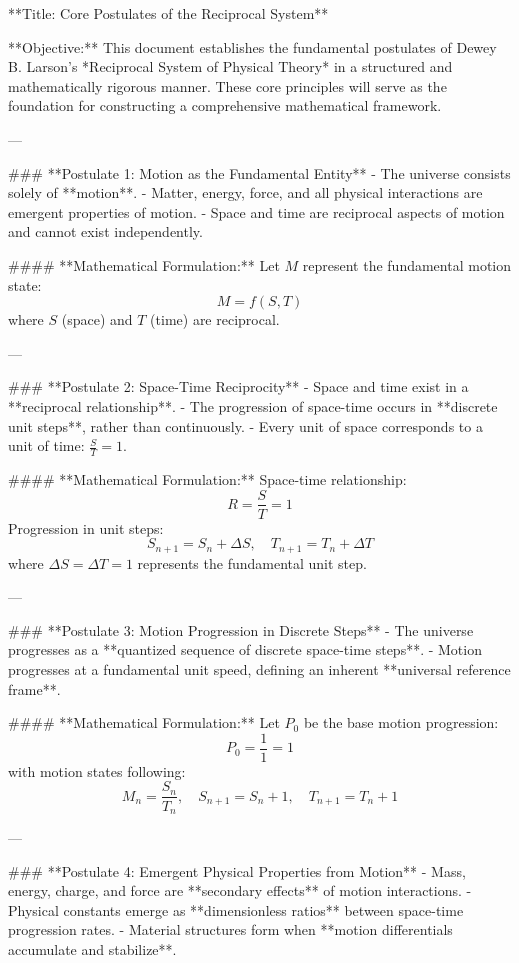 **Title: Core Postulates of the Reciprocal System**

**Objective:**
This document establishes the fundamental postulates of Dewey B. Larson’s *Reciprocal System of Physical Theory* in a structured and mathematically rigorous manner. These core principles will serve as the foundation for constructing a comprehensive mathematical framework.

---

### **Postulate 1: Motion as the Fundamental Entity**
- The universe consists solely of **motion**.
- Matter, energy, force, and all physical interactions are emergent properties of motion.
- Space and time are reciprocal aspects of motion and cannot exist independently.

#### **Mathematical Formulation:**
Let \( M \) represent the fundamental motion state:
\[
M = f(S, T)
\]
where \( S \) (space) and \( T \) (time) are reciprocal.

---

### **Postulate 2: Space-Time Reciprocity**
- Space and time exist in a **reciprocal relationship**.
- The progression of space-time occurs in **discrete unit steps**, rather than continuously.
- Every unit of space corresponds to a unit of time: \( \frac{S}{T} = 1 \).

#### **Mathematical Formulation:**
Space-time relationship:
\[
 R = \frac{S}{T} = 1
\]
Progression in unit steps:
\[
 S_{n+1} = S_n + \Delta S, \quad T_{n+1} = T_n + \Delta T
\]
where \( \Delta S = \Delta T = 1 \) represents the fundamental unit step.

---

### **Postulate 3: Motion Progression in Discrete Steps**
- The universe progresses as a **quantized sequence of discrete space-time steps**.
- Motion progresses at a fundamental unit speed, defining an inherent **universal reference frame**.

#### **Mathematical Formulation:**
Let \( P_0 \) be the base motion progression:
\[
 P_0 = \frac{1}{1} = 1
\]
with motion states following:
\[
 M_n = \frac{S_n}{T_n}, \quad S_{n+1} = S_n + 1, \quad T_{n+1} = T_n + 1
\]

---

### **Postulate 4: Emergent Physical Properties from Motion**
- Mass, energy, charge, and force are **secondary effects** of motion interactions.
- Physical constants emerge as **dimensionless ratios** between space-time progression rates.
- Material structures form when **motion differentials accumulate and stabilize**.

